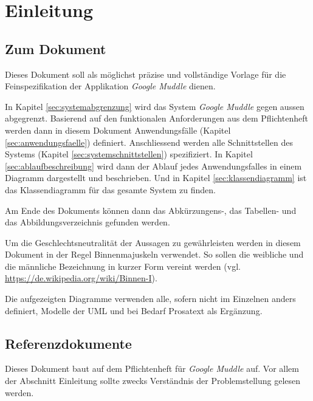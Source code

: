 \section{Einleitung}
\label{sec:einleitung}

\subsection{Zum Dokument}

Dieses Dokument soll als möglichst präzise und vollständige Vorlage für die
Feinspezifikation der Applikation \textit{Google Muddle} dienen.

In Kapitel \ref{sec:systemabgrenzung} wird das System \textit{Google Muddle}
gegen aussen abgegrenzt. Basierend auf den funktionalen Anforderungen aus dem
Pflichtenheft werden dann in diesem Dokument Anwendungsfälle (Kapitel
\ref{sec:anwendungsfaelle}) definiert. Anschliessend werden alle Schnittstellen
des Systems (Kapitel \ref{sec:systemschnittstellen}) spezifiziert. In Kapitel 
\ref{sec:ablaufbeschreibung} wird dann der Ablauf jedes Anwendungsfalles in
einem Diagramm dargestellt und beschrieben. Und in Kapitel
\ref{sec:klassendiagramm} ist das Klassendiagramm für das gesamte System zu
finden.

Am Ende des Dokuments können dann das Abkürzungens-, das Tabellen- und das
Abbildungsverzeichnis gefunden werden.

Um die Geschlechtsneutralität der Aussagen zu gewährleisten werden in diesem
Dokument in der Regel Binnenmajuskeln verwendet. So sollen die weibliche und die
männliche Bezeichnung in kurzer Form vereint werden (vgl.
\url{https://de.wikipedia.org/wiki/Binnen-I}).

Die aufgezeigten Diagramme verwenden alle, sofern nicht im Einzelnen anders
definiert, Modelle der \acs{UML} und bei Bedarf Prosatext als Ergänzung.

\subsection{Referenzdokumente}

Dieses Dokument baut auf dem Pflichtenheft für \textit{Google Muddle} auf. Vor
allem der Abschnitt Einleitung sollte zwecks Verständnis der Problemstellung
gelesen werden.
